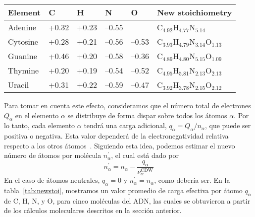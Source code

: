 \begin{table*}[t]
\begin{center}
\begin{tabular}{|p{}|p{}|p{}|p{
}|p{}|p{}|}
\hline
Element & C & H & N & O & New stoichiometry \\
\hline
Adenine & +0.32 & +0.23 & --0.55 &       & 
C$_{4.92}$H$_{4.77}$N$_{5.14}$ \\ 
\hline
Cytosine & +0.28 & +0.21 & --0.56 & --0.53 & 
C$_{3.93}$H$_{4.79}$N$_{3.14}$O$_{1.13}$ \\ 
\hline
Guanine & +0.46 & +0.20 & --0.58 & --0.36 & 
C$_{4.89}$H$_{4.80}$N$_{5.15}$O$_{1.09}$ \\ 
\hline
Thymine & +0.20 & +0.19 & --0.54 & --0.52 & 
C$_{4.95}$H$_{5.81}$N$_{2.13}$O$_{2.13}$ \\ 
\hline
Uracil & +0.31 & +0.22 & --0.59 & --0.47 & 
C$_{3.92}$H$_{3.78}$N$_{2.15}$O$_{2.12}$ \\ 
\hline
\end{tabular}
\caption[Cargas efectivas medias de Mulliken por átomo y nueva formula
estequiométrica]
{Cargas efectivas medias de Mulliken por átomo $q_{\alpha}$, y nueva formula
estequiométrica definida por la ecuación~(\ref{eq:newstoi}) para cinco
moléculas de ADN.}
\label{tab:newstoi}
\end{center}
\end{table*}

Para tomar en cuenta este efecto, consideramos que el número total de 
electrones $Q_{\alpha }$ en el elemento $\alpha$ se distribuye de forma
dispar sobre todos los átomos $\alpha$. Por lo tanto, cada elemento  
$\alpha$ tendrá una carga adicional, $q_{\alpha}=Q_{\alpha}/n_{\alpha}$, 
que puede ser positiva o negativa. Esta valor dependerá de la 
electronegatividad relativa respecto a los otros átomos~\cite{rappe1991}. 
Siguiendo esta idea, podemos estimar el nuevo número de átomos por 
molécula $n_{\alpha }^{\prime }$, el cual está dado por
\begin{equation}
n_{\alpha }^{\prime }=n_{\alpha }-
\frac{q_{\alpha }}{\nu_{\alpha }^{\text{CDW}}}
\label{eq:newstoi}
\end{equation}
En el caso de átomos neutrales, $q_{\alpha}=0$ y 
$n_{\alpha}^{\prime}=n_{\alpha}$, como debería ser. En la 
tabla~\ref{tab:newstoi}, mostramos un valor promedio de carga efectiva por
átomo $q_{\alpha}$ de C, H, N, y O, para cinco moléculas del ADN,
las cuales se obtuvieron a partir de los cálculos moleculares descritos 
en la sección anterior.

